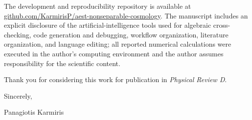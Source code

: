 \documentclass[11pt]{article}
\begin{document}
The development and reproducibility repository is available at
\href{https://github.com/KarmirisP/aest-nonseparable-cosmology}{github.com/KarmirisP/aest-nonseparable-cosmology}. The manuscript includes an explicit disclosure of the artificial-intelligence tools used for algebraic cross-checking, code generation and debugging, workflow organization, literature organization, and language editing; all reported numerical calculations were executed in the author's computing environment and the author assumes responsibility for the scientific content.

Thank you for considering this work for publication in \textit{Physical Review D}.

Sincerely,

\vspace{1em}
Panagiotis Karmiris
\end{document}
